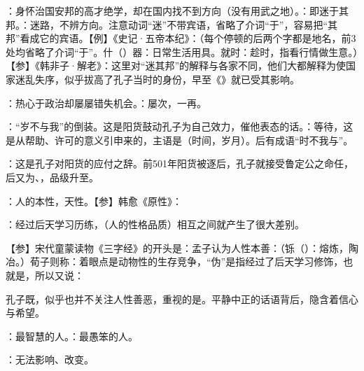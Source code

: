 {\item {}：身怀治国安邦的高才绝学，却在国内找不到方向（没有用武之地）。：即迷于其邦。：迷路，不辨方向。注意动词“迷”不带宾语，省略了介词“于”，容易把“其邦”看成它的宾语。【例】《史记·五帝本纪》：（每个停顿的后两个字都是地名，前3处均省略了介词“于”。什（）器：日常生活用具。就时：趁时，指看行情做生意。）【参】《韩非子·解老》：这里对“迷其邦”的解释与各家不同，他们大都解释为使国家迷乱失序，似乎拔高了孔子当时的身份，早至《》就已受其影响。

\item {}：热心于政治却屡屡错失机会。：屡次，一再。
\item {}：“岁不与我”的倒装。这是阳货鼓动孔子为自己效力，催他表态的话。：等待，这是从帮助、许可的意义引申来的，主语是（时间，岁月）。后有成语“时不我与”。
\item {}：这是孔子对阳货的应付之辞。前501年阳货被逐后，孔子就接受鲁定公之命任，后又为、，品级升至。
}
{}  %


{
\begin{lyitemize}
\item {}：人的本性，天性。【参】韩愈《原性》：
\item {}：经过后天学习历练，（人的性格品质）相互之间就产生了很大差别。
\end{lyitemize}
【参】宋代童蒙读物《三字经》的开头是：孟子认为人性本善：（铄（）：熔炼，陶冶。）荀子则称：着眼点是动物性的生存竞争，“伪”是指经过了后天学习修饰，也就是，所以又说：

孔子既，似乎也并不关注人性善恶，重视的是。平静中正的话语背后，隐含着信心与希望。
}
{}


{
\item {}：最智慧的人。：最愚笨的人。
\item {}：无法影响、改变。
}
{}  %



